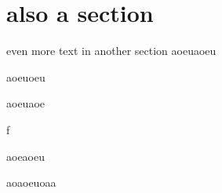 \section{also a section}
even more text in another section
aoeuaoeu

aoeuoeu \cite{Hansen_2015}

aoeuaoe \cite{Hansen_2011}

f

aoeaoeu

aoaoeuoaa
